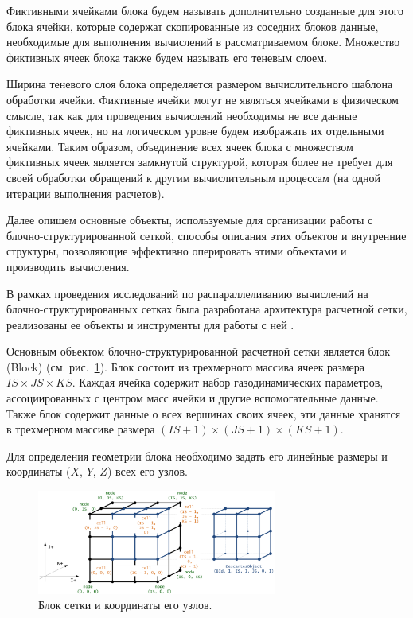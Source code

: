 \begin{definition}
Фиктивными ячейками блока будем называть дополнительно созданные для этого блока ячейки, которые содержат скопированные из соседних блоков данные, необходимые для выполнения вычислений в рассматриваемом блоке.
Множество фиктивных ячеек блока также будем называть его теневым слоем.
\end{definition}

Ширина теневого слоя блока определяется размером вычислительного шаблона обработки ячейки.
Фиктивные ячейки могут не являться ячейками в физическом смысле, так как для проведения вычислений необходимы не все данные фиктивных ячеек, но на логическом уровне будем изображать их отдельными ячейками.
Таким образом, объединение всех ячеек блока с множеством фиктивных ячеек является замкнутой структурой, которая более не требует для своей обработки обращений к другим вычислительным процессам (на одной итерации выполнения расчетов).

Далее опишем основные объекты, используемые для организации работы с блочно-структурированной сеткой, способы описания этих объектов и внутренние структуры, позволяющие эффективно оперировать этими объектами и производить вычисления.

В рамках проведения исследований по распараллеливанию вычислений на блочно-структурированных сетках была разработана архитектура расчетной сетки, реализованы ее объекты и инструменты для работы с ней \cite{CertRybakov2020PrepStruct}.

Основным объектом блочно-структурированной расчетной сетки является блок (Block) (см. рис.~\ref{fig:text_2_block_block_and_coords}). 
Блок состоит из трехмерного массива ячеек размера $IS \times JS \times KS$.
Каждая ячейка содержит набор газодинамических параметров, ассоциированных с центром масс ячейки и другие вспомогательные данные.
Также блок содержит данные о всех вершинах своих ячеек, эти данные хранятся в трехмерном массиве размера $(IS + 1) \times (JS + 1) \times (KS + 1)$.

Для определения геометрии блока необходимо задать его линейные размеры и координаты ($X$, $Y$, $Z$) всех его узлов.

\begin{figure}[ht]
\centering
\includegraphics[width=0.7\textwidth]{fig/par_6-block-and-coords.png}
\singlespacing
{}\caption{Блок сетки и координаты его узлов.}
\label{fig:text_2_block_block_and_coords}
\end{figure}

